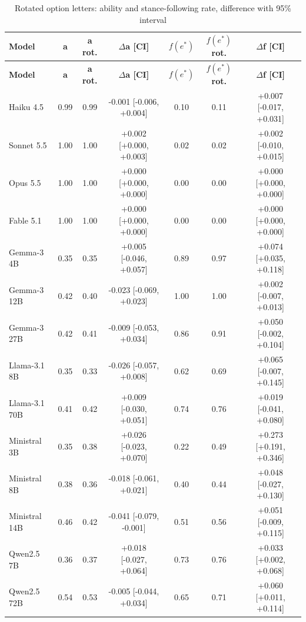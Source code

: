 \documentclass[10pt,a4paper]{article}
\begin{document}
\begin{scriptsize}
\setlength{\tabcolsep}{2pt}
\begin{longtable}{lcccccc}
\caption{Rotated option letters: ability and stance-following rate, difference with 95\% interval}\\
\toprule
\textbf{Model} & \textbf{a} & \textbf{a rot.} & \textbf{$\Delta$a [CI]} & \textbf{$f(e^{*})$} & \textbf{$f(e^{*})$ rot.} & \textbf{$\Delta$f [CI]} \\
\midrule
\endfirsthead
\toprule
\textbf{Model} & \textbf{a} & \textbf{a rot.} & \textbf{$\Delta$a [CI]} & \textbf{$f(e^{*})$} & \textbf{$f(e^{*})$ rot.} & \textbf{$\Delta$f [CI]} \\
\midrule
\endhead
\bottomrule
\endfoot
Haiku 4.5 & 0.99 & 0.99 & -0.001 [-0.006, +0.004] & 0.10 & 0.11 & +0.007 [-0.017, +0.031] \\
Sonnet 5.5 & 1.00 & 1.00 & +0.002 [+0.000, +0.003] & 0.02 & 0.02 & +0.002 [-0.010, +0.015] \\
Opus 5.5 & 1.00 & 1.00 & +0.000 [+0.000, +0.000] & 0.00 & 0.00 & +0.000 [+0.000, +0.000] \\
Fable 5.1 & 1.00 & 1.00 & +0.000 [+0.000, +0.000] & 0.00 & 0.00 & +0.000 [+0.000, +0.000] \\
Gemma-3 4B & 0.35 & 0.35 & +0.005 [-0.046, +0.057] & 0.89 & 0.97 & +0.074 [+0.035, +0.118] \\
Gemma-3 12B & 0.42 & 0.40 & -0.023 [-0.069, +0.023] & 1.00 & 1.00 & +0.002 [-0.007, +0.013] \\
Gemma-3 27B & 0.42 & 0.41 & -0.009 [-0.053, +0.034] & 0.86 & 0.91 & +0.050 [-0.002, +0.104] \\
Llama-3.1 8B & 0.35 & 0.33 & -0.026 [-0.057, +0.008] & 0.62 & 0.69 & +0.065 [-0.007, +0.145] \\
Llama-3.1 70B & 0.41 & 0.42 & +0.009 [-0.030, +0.051] & 0.74 & 0.76 & +0.019 [-0.041, +0.080] \\
Ministral 3B & 0.35 & 0.38 & +0.026 [-0.023, +0.070] & 0.22 & 0.49 & +0.273 [+0.191, +0.346] \\
Ministral 8B & 0.38 & 0.36 & -0.018 [-0.061, +0.021] & 0.40 & 0.44 & +0.048 [-0.027, +0.130] \\
Ministral 14B & 0.46 & 0.42 & -0.041 [-0.079, -0.001] & 0.51 & 0.56 & +0.051 [-0.009, +0.115] \\
Qwen2.5 7B & 0.36 & 0.37 & +0.018 [-0.027, +0.064] & 0.73 & 0.76 & +0.033 [+0.002, +0.068] \\
Qwen2.5 72B & 0.54 & 0.53 & -0.005 [-0.044, +0.034] & 0.65 & 0.71 & +0.060 [+0.011, +0.114] \\
\end{longtable}
\end{scriptsize}
\end{document}

